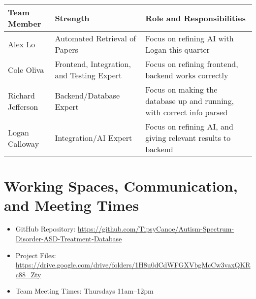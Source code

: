 \documentclass{article}
\begin{document}
\begin{tabularx}{\textwidth}{|X|X|X|}
    \hline
    \textbf{Team Member} & \textbf{Strength} & \textbf{Role and Responsibilities} \\
    \hline
    Alex Lo & Automated Retrieval of Papers & Focus on refining AI with Logan this quarter \\
    \hline
    Cole Oliva & Frontend, Integration, and Testing Expert & Focus on refining frontend, backend works correctly\\
    \hline
    Richard Jefferson & Backend/Database Expert & Focus on making the database up and running, with correct info parsed \\
    \hline
    Logan Calloway & Integration/AI Expert & Focus on refining AI, and giving relevant results to backend \\
    \hline
\end{tabularx}

\section*{Working Spaces, Communication, and Meeting Times}
\begin{itemize}
    \item GitHub Repository: \url{https://github.com/TipsyCanoe/Autism-Spectrum-Disorder-ASD-Treatment-Database}
    \item Project Files: \url{https://drive.google.com/drive/folders/1H8u0dCdWFGXVbgMcCw3vaxQKRc88_Zty}

    \item Team Meeting Times: Thursdays 11am--12pm

\end{itemize}
\end{document}
